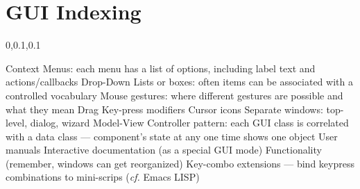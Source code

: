 
\section{GUI Indexing}\fbeg{}\begin{frame}{}


\vspace{-.5em}	

{\Large{}\selectfont

\hspace*{15pt}\begin{minipage}{.97\textwidth}
\vspace{4pt}
		
\begin{lightquadblockc}{0,0.1,0.1}{\parbox{21cm}{\centering \vspace{3pt}}}
\begin{center}\begin{minipage}{1.1\textwidth}
{\fontsize{19.5}{25}\selectfont \setlength{\leftmargini}{30pt}\begin{enumerate}
\dkitem {\dksp} Context Menus: each menu has a list of options, including 
label text and actions/callbacks %
\vspace{10pt} 
\dkitem {\dksp} Drop-Down Lists or  boxes: often items can be 
associated with a controlled vocabulary
\vspace{10pt}
\dkitem {\dksp} Mouse gestures: where different gestures are possible and 
what they mean %
 {\dksp}{\dksp}{\dksp}{\dksp}  \dmark{} {\dksp} Drag
 {\dksp}{\dksp}{\dksp}{\dksp}  \dmark{} {\dksp} Key-press modifiers
 {\dksp}{\dksp}{\dksp}{\dksp}  \dmark{} {\dksp} Cursor icons
\vspace{10pt}
\dkitem {\dksp} Separate windows: top-level, dialog, wizard
\vspace{10pt}
\dkitem {\dksp} Model-View Controller pattern: each GUI class is correlated with a data class 
--- component's state at any one time shows one object 
\vspace{10pt}
\dkitem {\dksp} User manuals %
 {\dksp}{\dksp} \dmark{} {\dksp} Interactive documentation (as a special GUI mode)
 {\dksp}{\dksp} \dmark{} {\dksp} Functionality (remember, windows can get reorganized)
\vspace{10pt}
\dkitem {\dksp} Key-combo extensions --- bind keypress combinations to mini-scrips 
(\textsl{cf.} Emacs LISP)

\end{enumerate}
}\end{minipage}
\end{center}
\end{lightquadblockc}
\end{minipage}

}


\end{frame}

